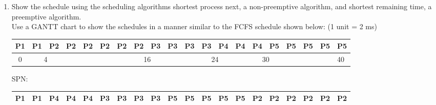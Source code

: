 \documentclass[12pt]{article}
\begin{document}
	\begin{enumerate}[label=\textbf{\alph*}.]
		\item Show the schedule using the scheduling algorithms shortest process next, a non-preemptive algorithm, and shortest remaining time, a preemptive algorithm. \\ Use a GANTT chart to show the schedules in a manner similar to the FCFS schedule shown below: (1 unit = 2 ms)
			\begin{table}[H]
				\centering
				\begin{adjustbox}{width=1\textwidth}
					\begin{tabular}{lcllllllllllllllllll}
					\hline
					\multicolumn{1}{|l|}{\textbf{P1}} & \multicolumn{1}{c|}{\textbf{P1}} & \multicolumn{1}{l|}{\textbf{P2}} & \multicolumn{1}{l|}{\textbf{P2}} & \multicolumn{1}{l|}{\textbf{P2}} & \multicolumn{1}{l|}{\textbf{P2}} & \multicolumn{1}{l|}{\textbf{P2}} & \multicolumn{1}{l|}{\textbf{P2}} & \multicolumn{1}{l|}{\textbf{P3}} & \multicolumn{1}{l|}{\textbf{P3}} & \multicolumn{1}{l|}{\textbf{P3}} & \multicolumn{1}{l|}{\textbf{P3}} & \multicolumn{1}{l|}{\textbf{P4}} & \multicolumn{1}{l|}{\textbf{P4}} & \multicolumn{1}{l|}{\textbf{P4}} & \multicolumn{1}{l|}{\textbf{P5}} & \multicolumn{1}{l|}{\textbf{P5}} & \multicolumn{1}{l|}{\textbf{P5}} & \multicolumn{1}{l|}{\textbf{P5}} & \multicolumn{1}{l|}{\textbf{P5}} \\ \hline
					\multicolumn{1}{c}{0}	& \multicolumn{2}{c}{4}	&	&	&	&	& \multicolumn{2}{c}{16}	&	&	& \multicolumn{2}{c}{24}	&	&	\multicolumn{2}{c}{30}	&	&	&	& 40                              
					\end{tabular}
				\end{adjustbox}
			\end{table}
			SPN:
			\begin{table}[H]
				\centering
				\begin{adjustbox}{width=1\textwidth}
					\begin{tabular}{lcllllllllllllllllll}
					\hline
					\multicolumn{1}{|l|}{\textbf{P1}} & \multicolumn{1}{c|}{\textbf{P1}} & \multicolumn{1}{l|}{\textbf{P4}} & \multicolumn{1}{l|}{\textbf{P4}} & \multicolumn{1}{l|}{\textbf{P4}} & \multicolumn{1}{l|}{\textbf{P3}} & \multicolumn{1}{l|}{\textbf{P3}} & \multicolumn{1}{l|}{\textbf{P3}} & \multicolumn{1}{l|}{\textbf{P3}} & \multicolumn{1}{l|}{\textbf{P5}} & \multicolumn{1}{l|}{\textbf{P5}} & \multicolumn{1}{l|}{\textbf{P5}} & \multicolumn{1}{l|}{\textbf{P5}} & \multicolumn{1}{l|}{\textbf{P5}} & \multicolumn{1}{l|}{\textbf{P2}} & \multicolumn{1}{l|}{\textbf{P2}} & \multicolumn{1}{l|}{\textbf{P2}} & \multicolumn{1}{l|}{\textbf{P2}} & \multicolumn{1}{l|}{\textbf{P2}} & \multicolumn{1}{l|}{\textbf{P2}} \\ \hline

\end{tabular}
\end{adjustbox}
\end{table}
\end{enumerate}
\end{document}
